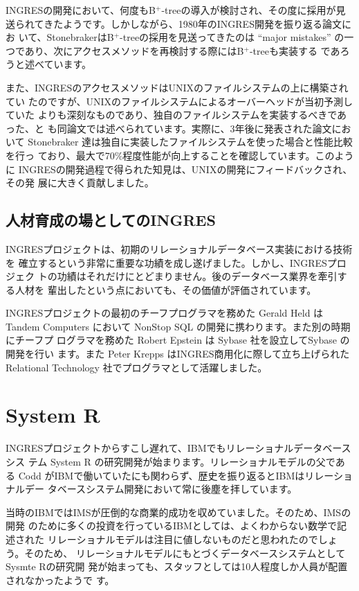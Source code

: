 INGRESの開発において、何度もB$^+$-treeの導入が検討され、その度に採用が見
送られてきたようです。しかしながら、1980年のINGRES開発を振り返る論文にお
いて、StonebrakerはB$^+$-treeの採用を見送ってきたのは ``major mistakes''
の一つであり、次にアクセスメソッドを再検討する際にはB$^+$-treeも実装する
であろうと述べています。


また、INGRESのアクセスメソッドはUNIXのファイルシステムの上に構築されてい
たのですが、UNIXのファイルシステムによるオーバーヘッドが当初予測していた
よりも深刻なものであり、独自のファイルシステムを実装するべきであった、と
も同論文では述べられています。実際に、3年後に発表された論文において
Stonebraker 達は独自に実装したファイルシステムを使った場合と性能比較を行っ
ており、最大で70\%程度性能が向上することを確認しています。このように
INGRESの開発過程で得られた知見は、UNIXの開発にフィードバックされ、その発
展に大きく貢献しました。


\subsection{人材育成の場としてのINGRES}


INGRESプロジェクトは、初期のリレーショナルデータベース実装における技術を
確立するという非常に重要な功績を成し遂げました。しかし、INGRESプロジェク
トの功績はそれだけにとどまりません。後のデータベース業界を牽引する人材を
輩出したという点においても、その価値が評価されています。


INGRESプロジェクトの最初のチーフプログラマを務めた Gerald Held はTandem
Computers において NonStop SQL の開発に携わります。また別の時期にチーフプ
ログラマを務めた Robert Epstein は Sybase 社を設立してSybase の開発を行い
ます。また Peter Krepps はINGRES商用化に際して立ち上げられた Relational
Technology 社でプログラマとして活躍しました。


\section{System R}


INGRESプロジェクトからすこし遅れて、IBMでもリレーショナルデータベースシス
テム System R の研究開発が始まります。リレーショナルモデルの父である
Codd がIBMで働いていたにも関わらず、歴史を振り返るとIBMはリレーショナルデー
タベースシステム開発において常に後塵を拝しています。


当時のIBMではIMSが圧倒的な商業的成功を収めていました。そのため、IMSの開発
のために多くの投資を行っているIBMとしては、よくわからない数学で記述された
リレーショナルモデルは注目に値しないものだと思われたのでしょう。そのため、
リレーショナルモデルにもとづくデータベースシステムとしてSysmte Rの研究開
発が始まっても、スタッフとしては10人程度しか人員が配置されなかったようで
す。


